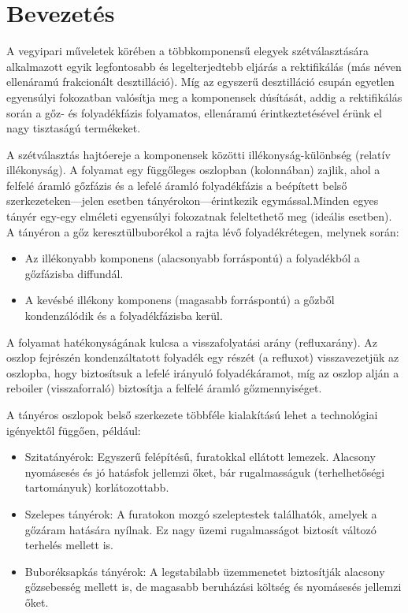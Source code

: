 \chapter*{Bevezetés}\label{ch:Abevez}

A vegyipari műveletek körében a többkomponensű elegyek
szétválasztására alkalmazott egyik legfontosabb és legelterjedtebb
eljárás a rektifikálás (más néven ellenáramú frakcionált
desztilláció). Míg az egyszerű desztilláció csupán egyetlen
egyensúlyi fokozatban valósítja meg a komponensek dúsítását, addig a
rektifikálás során a gőz- és folyadékfázis folyamatos, ellenáramú
érintkeztetésével érünk el nagy tisztaságú termékeket.

A szétválasztás hajtóereje a komponensek közötti
illékonyság-különbség (relatív illékonyság). A folyamat egy
függőleges oszlopban (kolonnában) zajlik, ahol a felfelé áramló
gőzfázis és a lefelé áramló folyadékfázis a beépített belső
szerkezeteken---jelen esetben tányérokon---érintkezik
egymással.Minden egyes tányér egy-egy elméleti egyensúlyi fokozatnak
feleltethető meg (ideális esetben). A tányéron a gőz
keresztülbuborékol a rajta lévő folyadékrétegen, melynek során:
\begin{itemize}
  \item Az illékonyabb komponens (alacsonyabb forráspontú) a
    folyadékból a gőzfázisba diffundál.
  \item A kevésbé illékony komponens (magasabb forráspontú) a gőzből
    kondenzálódik és a folyadékfázisba kerül.
\end{itemize}

A folyamat hatékonyságának kulcsa a visszafolyatási arány
(refluxarány). Az oszlop fejrészén kondenzáltatott folyadék egy
részét (a refluxot) visszavezetjük az oszlopba, hogy biztosítsuk a
lefelé irányuló folyadékáramot, míg az oszlop alján a reboiler
(visszaforraló) biztosítja a felfelé áramló gőzmennyiséget.

A tányéros oszlopok belső szerkezete többféle kialakítású lehet a
technológiai igényektől függően, például:
\begin{itemize}
  \item Szitatányérok: Egyszerű felépítésű, furatokkal ellátott
    lemezek. Alacsony nyomásesés és jó hatásfok jellemzi őket, bár
    rugalmasságuk (terhelhetőségi tartományuk) korlátozottabb.

  \item Szelepes tányérok: A furatokon mozgó szeleptestek találhatók,
    amelyek a gőzáram hatására nyílnak. Ez nagy üzemi rugalmasságot
    biztosít változó terhelés mellett is.

  \item Buboréksapkás tányérok: A legstabilabb üzemmenetet
    biztosítják alacsony gőzsebesség mellett is, de magasabb
    beruházási költség és nyomásesés jellemzi őket.
\end{itemize}

